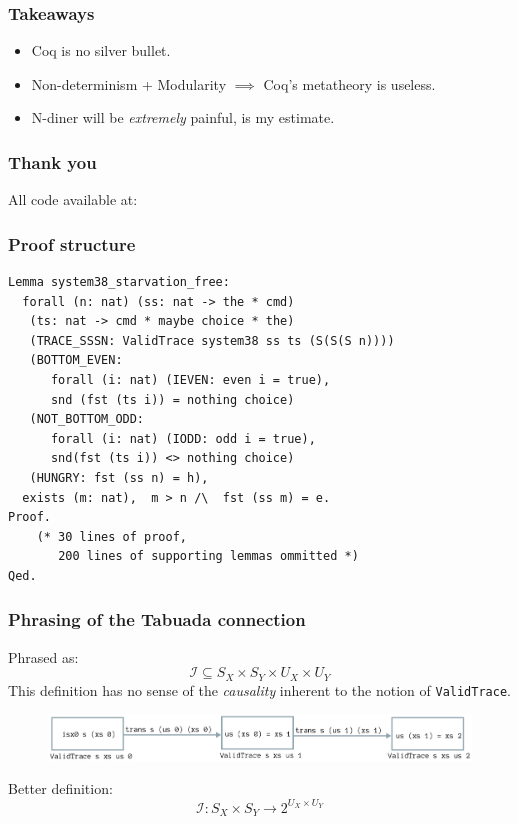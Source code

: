 \documentclass{beamer}
\begin{document}
\begin{frame}[fragile]
\frametitle{Takeaways}
\begin{itemize}
	\item Coq is no silver bullet. \pause
	\item Non-determinism + Modularity $\implies$ Coq's metatheory is useless. \pause
	\item N-diner will be \textit{extremely} painful, is my estimate.
\end{itemize}
\end{frame}

\begin{frame}[fragile]
\frametitle{Thank you}
    All code available at:

    {\tiny
    }

\end{frame}

\begin{frame}[fragile]
\frametitle{Proof structure}
\begin{verbatim}
Lemma system38_starvation_free:
  forall (n: nat) (ss: nat -> the * cmd)
   (ts: nat -> cmd * maybe choice * the)
   (TRACE_SSSN: ValidTrace system38 ss ts (S(S(S n))))
   (BOTTOM_EVEN: 
      forall (i: nat) (IEVEN: even i = true), 
      snd (fst (ts i)) = nothing choice)
   (NOT_BOTTOM_ODD: 
      forall (i: nat) (IODD: odd i = true),
      snd(fst (ts i)) <> nothing choice)
   (HUNGRY: fst (ss n) = h),
  exists (m: nat),  m > n /\  fst (ss m) = e.
Proof.
    (* 30 lines of proof, 
       200 lines of supporting lemmas ommitted *)
Qed.
\end{verbatim}
\end{frame}



\begin{frame}[fragile]
\frametitle{Phrasing of the Tabuada connection}

Phrased as: $$\mathcal{I} \subseteq S_X \times S_Y \times U_X \times U_Y$$
\pause
This definition has no sense of the \emph{causality} inherent to the notion
of \texttt{ValidTrace}.
\pause
\begin{figure}[H]
\includegraphics[width=\textwidth]{validtrace.png}
\end{figure}
\pause
Better definition:
$$\mathcal{I}: S_X \times S_Y \rightarrow  2^{U_X \times U_Y}$$

\end{frame}
\end{document}

